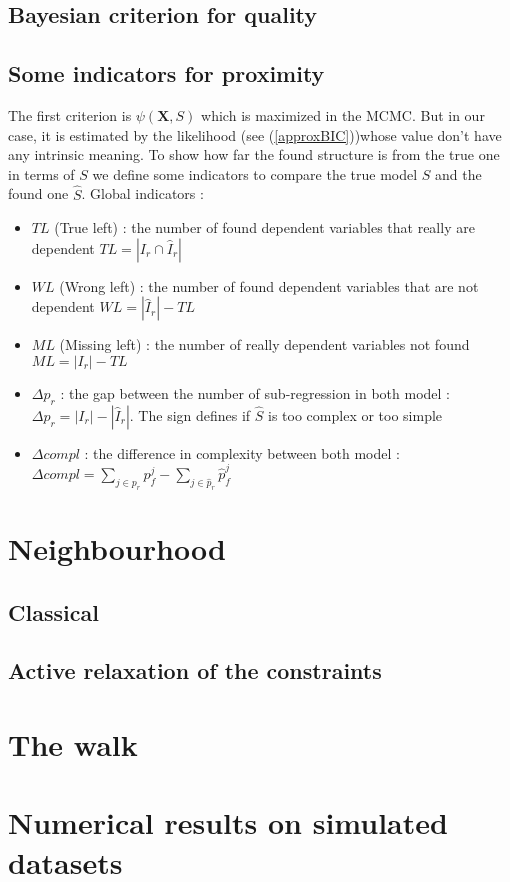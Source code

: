 \documentclass[11pt,a4paper]{report}
\begin{document}
		\subsection{Bayesian criterion for quality}
		\subsection{Some indicators for proximity}
		The first criterion is $\psi(\boldsymbol{X},S)$ which is maximized in the MCMC. But in our case, it is estimated by the likelihood (see (\ref{approxBIC}))whose value don't have any intrinsic meaning. To show how far the found structure is from the true one in terms of $S$ we define some indicators to compare the true model $S$ and the found one $\hat{S}$.
			Global indicators :
			\begin{itemize}
				\item $TL$ (True left) : the number of found dependent variables that really are dependent $TL=|I_r\cap \hat{I}_r|$ 
				\item $WL$ (Wrong left) : the number of found dependent variables that are not dependent $WL=|\hat{I}_r|-TL$
				\item $ML$ (Missing left) : the number of really dependent variables not found $ML=|I_r|-TL$
				\item $\Delta p_r$ : the gap between the number of sub-regression in both model : $\Delta p_r=|I_r|-|\hat{I}_r|$. The sign defines if $\hat{S}$ is too complex or too simple
				\item $\Delta compl$ : the difference in complexity between both model : $\Delta compl=\sum_{j \in p_r}p_f^j-\sum_{j \in \hat{p}_r}\hat{p}_f^j$
			\end{itemize}
	\section{Neighbourhood}
		\subsection{Classical}
		\subsection{Active relaxation of the constraints}
	\section{The walk}
	
	\section{Numerical results on simulated datasets} \label{sectionsimul}
\end{document}
